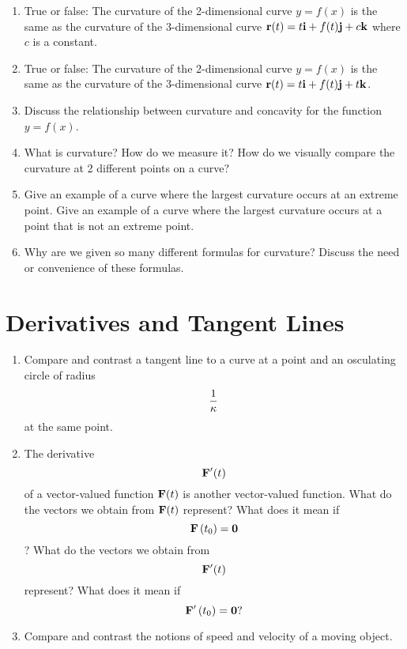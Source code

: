 \begin{enumerate}
\item True or false:  The curvature of the 2-dimensional curve $y = f(x)$ is the same as the curvature of the 3-dimensional curve ${{\bf{r}}}(t) = t{\bf{i}} + f(t){\bf{j}} + c{\bf{k}}$ where $c$ is a constant.  \cite{SM}

\item True or false:  The curvature of the 2-dimensional curve $y = f(x)$ is the same as the curvature of the 3-dimensional curve ${\bf{r}}(t) = t{\bf{i}} + f(t){\bf{j}} + t{\bf{k}}$.  \cite{SM}

\item Discuss the relationship between curvature and concavity for the function $y = f(x)$. \cite{SM}

\item What is curvature?  How do we measure it?  How do we visually compare the curvature at 2 different points on a curve?

\item Give an example of a curve where the largest curvature occurs at an extreme point.  Give an example of a curve where the largest curvature occurs at a point that is not an extreme point.

\item Why are we given so many different formulas for curvature?  Discuss the need or convenience of these formulas.

\end{enumerate}\section{Derivatives and Tangent Lines}\begin{enumerate}

\item Compare and contrast a tangent line to a curve at a point and an osculating circle of radius $${1 \over \kappa }$$ at the same point.

\item The derivative $${\bf{F'}}(t)$$ of a vector-valued function ${\bf{F}}(t)$ is another vector-valued function.  What do the vectors we obtain from ${\bf{F}}(t)$ represent?  What does it mean if $${{\bf{F}}}\left( {t_0 } \right) = {\bf{0}}$$? What do the vectors we obtain from $${\bf{F'}}(t)$$ represent?  What does it mean if $${\bf{F'}}\left( {t_0 } \right) = {\bf{0}}?$$

\item Compare and contrast the notions of speed and velocity of a moving object.  \cite{SBS}


\end{enumerate}
